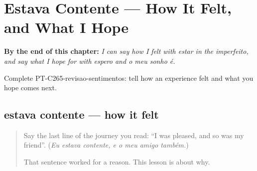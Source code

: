 
\chapter{Estava Contente --- How It Felt, and What I Hope}
\label{ch:pt-how-it-felt-and-what-i-hope}

\begin{chapteropening}
\textbf{By the end of this chapter:} \emph{I can say how I felt with estar in the imperfeito, and say what I hope for with espero and o meu sonho é.}

Complete PT-C265-revisao-sentimentos: tell how an experience felt and what you hope comes next.
\end{chapteropening}

\section[estava contente, estava nervoso]{estava contente — how it felt}

\label{lesson:PT-C265-estava-contente}



\begin{quote}
Say the last line of the journey you read: \textquotedblleft{}I was pleased, and so was my friend\textquotedblright{}. (\emph{Eu estava contente, e o meu amigo também.})

That sentence worked for a reason. This lesson is about why.
\end{quote}

